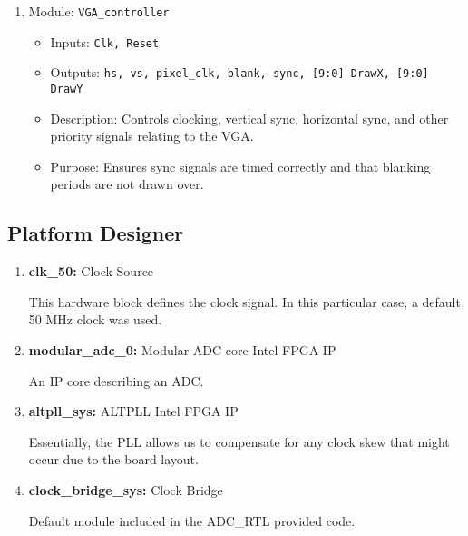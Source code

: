 \begin{enumerate}
    \item Module: \texttt{VGA\_controller}
    \begin{itemize}
        \item Inputs: \texttt{Clk, Reset} 
        \item Outputs: \texttt{hs, vs, pixel\_clk, blank, sync, [9:0] DrawX, [9:0] DrawY}
        \item Description: Controls clocking, vertical sync, horizontal sync, and other priority signals relating to the VGA.
        \item Purpose: Ensures sync signals are timed correctly and that blanking periods are not drawn over.
    \end{itemize}
    
\end{enumerate}


\subsection{Platform Designer}

\begin{enumerate}
    \item \textbf{clk\_50:} Clock Source
        
        \quad This hardware block defines the clock signal. In this particular case, a default 50 MHz clock was used.
    
    \item \textbf{modular\_adc\_0:} Modular ADC core Intel FPGA IP
    
        \quad An IP core describing an ADC.
    
    \item \textbf{altpll\_sys:} ALTPLL Intel FPGA IP
    
        \quad Essentially, the PLL allows us to compensate for any clock skew that might occur due to the board layout.
    
    \item \textbf{clock\_bridge\_sys:} Clock Bridge
    
        \quad Default module included in the ADC\_RTL provided code.
        
\end{enumerate}

